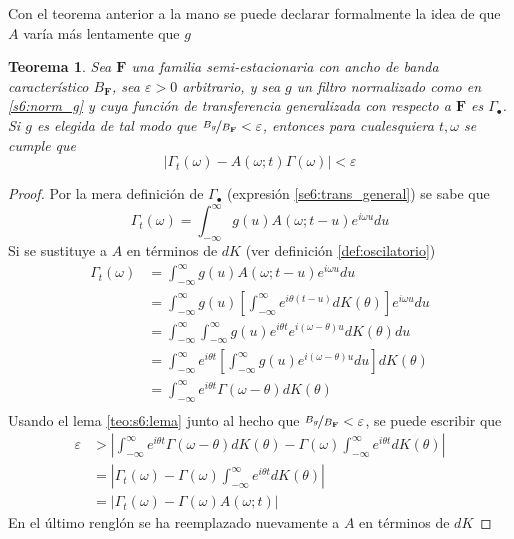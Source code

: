 \documentclass[12pt,letterpaper,draft]{book}
\newtheorem{teorema}{Teorema}[chapter]
\newcommand{\intR}{\int_{-\infty}^{\infty}}
\newcommand{\ef}{\mathbf{F}}
\newcommand{\abso}[1]{\left| #1 \right|}
\begin{document}
Con el teorema anterior a la mano se puede declarar formalmente la idea de que $A$ varía más lentamente que $g$

\begin{teorema}
Sea $\ef$ una familia semi-estacionaria con ancho de banda característico $B_\ef$, sea $\varepsilon >0$ arbitrario, y sea $g$ un filtro normalizado como en \ref{s6:norm_g} y cuya función de transferencia generalizada con respecto a $\ef$ es $\Gamma_\bullet$. 
%
Si $g$ es elegida de tal modo que $\nicefrac{B_g}{B_\ef} < \varepsilon$, entonces para cualesquiera $t, \omega$ se cumple que
\begin{equation}
\abso{\Gamma_t(\omega)- A(\omega; t)\Gamma(\omega)} < \varepsilon
\end{equation}
\label{teo:aprox_gamma} 
\end{teorema}

\begin{proof}
Por la mera definición de $\Gamma_\bullet$ (expresión \ref{se6:trans_general}) se sabe que
\begin{equation*}
\Gamma_t (\omega) = \intR g(u) A(\omega; t-u) e^{i \omega u} du
\end{equation*}
Si se sustituye a $A$ en términos de $dK$ (ver definición \ref{def:oscilatorio})
\begin{align*}
\Gamma_t (\omega) &= \intR g(u) A(\omega; t-u) e^{i \omega u} du \\
&= 
\intR g(u) \left[ \intR e^{i \theta (t-u)} dK(\theta) \right] e^{i \omega u} du \\
&=
\intR \intR g(u) e^{i \theta t} e^{i (\omega- \theta) u} dK(\theta) du \\
&=
\intR e^{i \theta t} \left[ \intR g(u) e^{i (\omega- \theta) u} du \right] dK(\theta) \\
&=
\intR e^{i \theta t} \Gamma(\omega - \theta) dK(\theta) \\
\end{align*}
Usando el lema \ref{teo:s6:lema} junto al hecho que $\nicefrac{B_g}{B_\ef} < \varepsilon$, se puede escribir que
\begin{align*}
\varepsilon 
&> 
\abso{\intR e^{i \theta t} \Gamma(\omega - \theta) dK(\theta) - 
\Gamma(\omega) \intR e^{i \theta t} dK(\theta) } \\
&=
\abso{\Gamma_t (\omega) - 
\Gamma(\omega) \intR e^{i \theta t} dK(\theta) } \\
&=
\abso{\Gamma_t (\omega) - 
\Gamma(\omega) A(\omega; t) }
\end{align*}
En el último renglón se ha reemplazado nuevamente a $A$ en términos de $dK	$
\end{proof}
\end{document}
